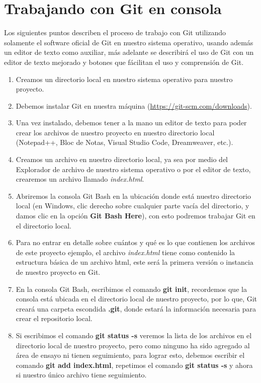 




\section{Trabajando con Git en consola}
\hspace{0.55cm}Los siguientes puntos describen el proceso de trabajo con Git utilizando solamente el software oficial de Git en nuestro sistema operativo, usando además un editor de texto como auxiliar, más adelante se describirá el uso de Git con un editor de texto mejorado y botones que fácilitan el uso y comprensión de Git.
\begin{enumerate}
    \item Creamos un directorio local en nuestro sistema operativo para nuestro proyecto.
    \item Debemos instalar Git en nuestra máquina (\underline{https://git-scm.com/downloads}).
    \item Una vez instalado, debemos tener a la mano un editor de texto para poder crear los archivos de nuestro proyecto en nuestro directorio local (Notepad++, Bloc de Notas, Visual Studio Code, Dreamweaver, etc.).
    \item Creamos un archivo en nuestro directorio local, ya sea por medio del Explorador de archivo de nuestro sistema operativo o por el editor de texto, crearemos un archivo llamado \textit{index.html}.
    \item Abriremos la consola Git Bash en la ubicación donde está nuestro directorio local (en Windows, clic derecho sobre cualquier parte vacía del directorio, y damos clic en la opción \textbf{Git Bash Here}), con esto podremos trabajar Git en el directorio local.
    \item Para no entrar en detalle sobre cuántos y qué es lo que contienen los archivos de este proyecto ejemplo, el archivo \textit{index.html} tiene como contenido la estructura básica de un archivo html, este será la primera versión o instancia de nuestro proyecto en Git.
    \item En la consola Git Bash, escribimos el comando \textbf{git init}, recordemos que la consola está ubicada en el directorio local de nuestro proyecto, por lo que, Git creará una carpeta escondida \textbf{.git}, donde estará la información necesaria para crear el repositorio local.
    \item Si escribimos el comando \textbf{git status -s} veremos la lista de los archivos en el directorio local de nuestro proyecto, pero como ninguno ha sido agregado al área de ensayo ni tienen seguimiento, para lograr esto, debemos escribir el comando \textbf{git add index.html}, repetimos el comando \textbf{git status -s} y ahora si nuestro único archivo tiene seguimiento.

\end{enumerate}
